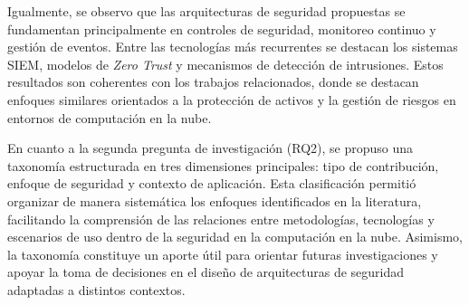 Igualmente, se observo que las arquitecturas de seguridad propuestas se fundamentan principalmente en controles de seguridad, 
monitoreo continuo y gestión de eventos. Entre las tecnologías más recurrentes se destacan los sistemas SIEM, modelos de 
\textit{Zero Trust} y mecanismos de detección de intrusiones. Estos resultados son coherentes con los trabajos relacionados, 
donde se destacan enfoques similares orientados a la protección de activos y la gestión de riesgos en entornos de computación en 
la nube.

En cuanto a la segunda pregunta de investigación (RQ2), se propuso una taxonomía estructurada en tres dimensiones principales: 
tipo de contribución, enfoque de seguridad y contexto de aplicación. Esta clasificación permitió organizar de manera sistemática 
los enfoques identificados en la literatura, facilitando la comprensión de las relaciones entre metodologías, tecnologías y 
escenarios de uso dentro de la seguridad en la computación en la nube. Asimismo, la taxonomía constituye un aporte útil para 
orientar futuras investigaciones y apoyar la toma de decisiones en el diseño de arquitecturas de seguridad adaptadas a distintos 
contextos.